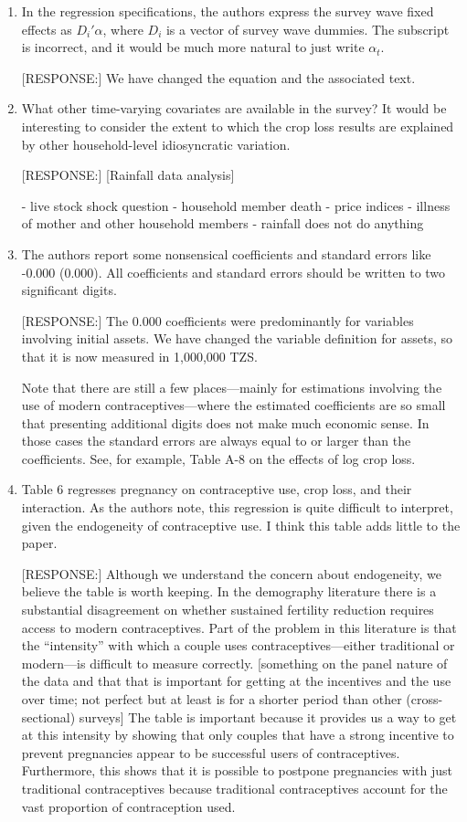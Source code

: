 \documentclass[letterpaper,12pt]{article}
\begin{document}
\begin{enumerate}
\item In the regression specifications, the authors express the survey
wave fixed effects as $D_{i}'\alpha$, where $D_{i}$ is a vector of survey
wave dummies. The subscript is incorrect, and it would be much more
natural to just write $\alpha_{t}$.

[RESPONSE:] We have changed the equation and the associated text.

\item What other time-varying covariates are available in the survey? It
would be interesting to consider the extent to which the crop loss
results are explained by other household-level idiosyncratic variation.

[RESPONSE:] [Rainfall data analysis]

- live stock shock question
- household member death
- price indices
- illness of mother and other household members
- rainfall does not do anything


\item The authors report some nonsensical coefficients and standard
errors like -0.000 (0.000). All coefficients and standard errors should
be written to two significant digits.

[RESPONSE:] The 0.000 coefficients were predominantly for variables
involving initial assets. 
We have changed the variable definition for assets, so that it is
now measured in 1,000,000 TZS. 

Note that there are still a few places---mainly for estimations
involving the use of modern contraceptives---where the estimated 
coefficients are so small that presenting additional digits does not make
much economic sense.
In those cases the standard errors are always equal to or larger than
the coefficients.
See, for example, Table A-8 on the effects of log crop loss.


\item Table 6 regresses pregnancy on contraceptive use, crop loss, and
their interaction. As the authors note, this regression is quite
difficult to interpret, given the endogeneity of contraceptive use. I
think this table adds little to the paper.

[RESPONSE:] Although we understand the concern about endogeneity, 
we believe the table is worth keeping. 
In the demography literature there is a substantial disagreement on whether
sustained fertility reduction requires access to modern contraceptives.
Part of the problem in this literature is that the ``intensity'' with
which a couple uses contraceptives---either traditional or modern---is
difficult to measure correctly.
[something on the panel nature of the data and that that is important
for getting at the incentives and the use over time; not perfect but
at least is for a shorter period than other (cross-sectional) surveys]
The table is important because it provides us a way to get at this
intensity by showing that only couples that have a strong incentive to
prevent pregnancies appear to be successful users of contraceptives.
Furthermore, this shows that it is possible to postpone pregnancies with
just traditional contraceptives because traditional contraceptives account 
for the vast proportion of contraception used.


\end{enumerate}
\end{document}
